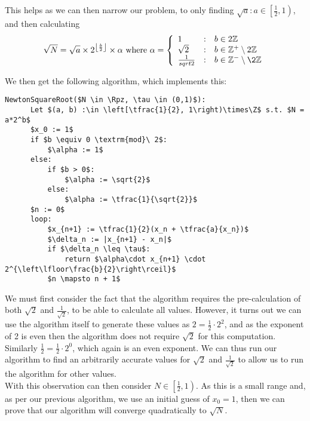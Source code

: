 This helps as we can then narrow our problem, to only finding \(\sqrt{a} : a \in \left[\frac{1}{2}, 1\right)\), and then calculating 
\begin{displaymath}
	\sqrt{N} = \sqrt{a} \times 2^{\left\lfloor \frac{b}{2} \right\rfloor} \times \alpha \ \mathrm{where}\  
	\alpha = \left\{
		\begin{array}{lcl}
			1 & : & b \in 2\Z \\
			\sqrt{2} & : & b \in \Zp\setminus2\Z \\
			\frac{1}{sqrt{2}} & : & b \in \Zn\setminus\2\Z
		\end{array}\right.
\end{displaymath}

We then get the following algorithm, which implements this:

\begin{lstlisting}[frame=single,mathescape,caption={Newton Method for Square Root v3},label={PCD_"Newton Method for Square Root v3"}]
  NewtonSquareRoot($N \in \Rpz, \tau \in (0,1)$):
      Let $(a, b) :\in \left[\tfrac{1}{2}, 1\right)\times\Z$ s.t. $N = a*2^b$
      $x_0 := 1$
      if $b \equiv 0 \textrm{mod}\ 2$:
          $\alpha := 1$
      else:
          if $b > 0$:
              $\alpha := \sqrt{2}$
          else:
              $\alpha := \tfrac{1}{\sqrt{2}}$
      $n := 0$
      loop:
          $x_{n+1} := \tfrac{1}{2}(x_n + \tfrac{a}{x_n})$
          $\delta_n := |x_{n+1} - x_n|$
          if $\delta_n \leq \tau$:
              return $\alpha\cdot x_{n+1} \cdot 2^{\left\lfloor\frac{b}{2}\right\rceil}$
          $n \mapsto n + 1$
\end{lstlisting}

We must first consider the fact that the algorithm requires the pre-calculation of both \(\sqrt{2}\) and \(\tfrac{1}{\sqrt{2}}\), to be able to calculate all values. However, it turns out we can use the algorithm itself to generate these values as \(2 = \tfrac{1}{2} \cdot 2^2\), and as the exponent of 2 is even then the algorithm does not require \(\sqrt{2}\) for this computation. Similarly \(\tfrac{1}{2} = \tfrac{1}{2} \cdot 2^0\), which again is an even exponent. We can thus run our algorithm to find an arbitrarily accurate values for \(\sqrt{2}\) and \(\tfrac{1}{\sqrt{2}}\) to allow us to run the algorithm for other values.\\

With this observation can then consider \(N \in \left[\tfrac{1}{2}, 1\right)\). As this is a small range and, as per our previous algorithm, we use an initial guess of \(x_0 = 1\), then we can prove that our algorithm will converge quadratically to \(\sqrt{N}\).

